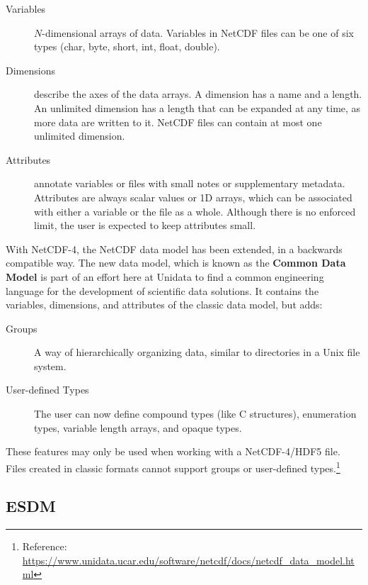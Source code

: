 \begin{description}

\item[Variables] $N$-dimensional arrays of data. Variables in NetCDF files can be one of six types (char, byte, short, int, float, double).

\item[Dimensions] describe the axes of the data arrays. A dimension has a name and a length. An unlimited dimension has a length that can be expanded at any time, as more data are written to it. NetCDF files can contain at most one unlimited dimension.

\item[Attributes] annotate variables or files with small notes or supplementary metadata. Attributes are always scalar values or 1D arrays, which can be associated with either a variable or the file as a whole. Although there is no enforced limit, the user is expected to keep attributes small.

\end{description}

With NetCDF-4, the NetCDF data model has been extended, in a backwards compatible way. The new data model, which is known as the \textbf{Common Data Model} is part of an effort here at Unidata to find a common engineering language for the development of scientific data solutions. It contains the variables, dimensions, and attributes of the classic data model, but adds:

\begin{description}

\item[Groups] A way of hierarchically organizing data, similar to directories in a Unix file system.

\item[User-defined Types] The user can now define compound types (like C structures), enumeration types, variable length arrays, and opaque types.

\end{description}

These features may only be used when working with a NetCDF-4/HDF5 file. Files created in classic formats cannot support groups or user-defined types.\footnote{Reference: \url{https://www.unidata.ucar.edu/software/netcdf/docs/netcdf_data_model.html}}

\subsection{ESDM}



